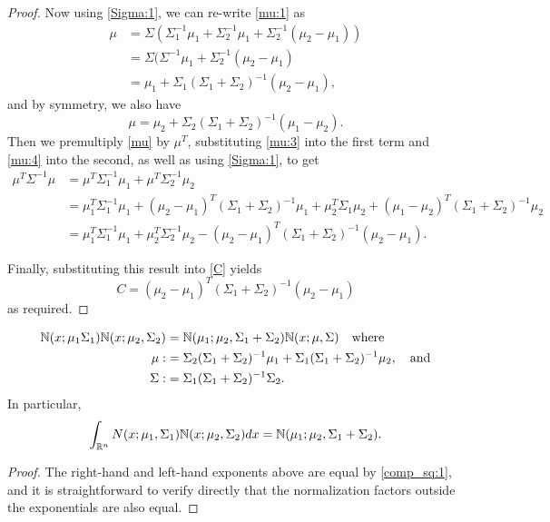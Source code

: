 \documentclass[12pt,leqno]{article}
\begin{document}
\begin{proof}
Now using \eqref{Sigma:1}, we can re-write \eqref{mu:1} as  
\begin{equation}\label{mu:3}
  \begin{split}
  \mu &= \Sigma(\Sigma_1^{-1}\mu_1 + \Sigma_2^{-1}\mu_1 +\Sigma_2^{-1}(\mu_2-\mu_1)) \\
  &= \Sigma(\Sigma^{-1}\mu_1 + \Sigma_2^{-1}(\mu_2-\mu_1) \\
  &= \mu_1 + \Sigma_1(\Sigma_1+\Sigma_2)^{-1}(\mu_2-\mu_1),
  \end{split}
  \end{equation}
and by symmetry, we also have 
\begin{equation}\label{mu:4}
  \mu = \mu_2 + \Sigma_2(\Sigma_1+\Sigma_2)^{-1}(\mu_1-\mu_2).
\end{equation}
Then we premultiply \eqref{mu} by $\mu^T$, substituting \eqref{mu:3} into the first term and
  \eqref{mu:4} into the second, as well as using \eqref{Sigma:1}, to get 
\begin{align*}
    \mu^T\Sigma^{-1}\mu &= \mu^T\Sigma_1^{-1}\mu_1 + \mu^T\Sigma_2^{-1}\mu_2 \\
    &= \mu_1^T\Sigma_1^{-1}\mu_1 + (\mu_2-\mu_1)^T(\Sigma_1+\Sigma_2)^{-1}\mu_1
    +\mu_2^T\Sigma_1\mu_2 + (\mu_1-\mu_2)^T(\Sigma_1+\Sigma_2)^{-1}\mu_2\\
    &= \mu_1^T\Sigma_1^{-1}\mu_1 + \mu_2^T\Sigma_2^{-1}\mu_2 - (\mu_2-\mu_1)^T(\Sigma_1+\Sigma_2)^{-1}(\mu_2-\mu_1).
\end{align*}

Finally, substituting this result into \eqref{C} yields
\begin{equation}\label{C:1}
  C = (\mu_2-\mu_1)^T(\Sigma_1+\Sigma_2)^{-1}(\mu_2-\mu_1)
\end{equation}
as required.
\end{proof}

\begin{Cor}
\begin{align}
  {\mathbb N}(x;\mu_1\Sigma_1){\mathbb N}(x;\mu_2,\Sigma_2) &= {\mathbb N}(\mu_1;\mu_2,\Sigma_1+\Sigma_2)
  {\mathbb N}(x;\mu,\Sigma) \quad\text{where}\label{comp_sq:2}\\
 \mu :&= \Sigma_2(\Sigma_1+\Sigma_2)^{-1}\mu_1+\Sigma_1(\Sigma_1+\Sigma_2)^{-1}\mu_2, \quad\text{and}\notag\\
 \Sigma :&= \Sigma_1(\Sigma_1 + \Sigma_2)^{-1}\Sigma_2.\notag
\end{align}
In particular,
\begin{equation}\label{int_prod}
  \int_{{\mathbb R}^n}N(x;\mu_1,\Sigma_1){\mathbb N}(x;\mu_2,\Sigma_2)dx = {\mathbb N}(\mu_1;\mu_2,\Sigma_1+\Sigma_2).
  \end{equation}
\begin{proof}
  The right-hand and left-hand exponents above are equal by \eqref{comp_sq:1}, and it is
  straightforward to verify directly that the normalization factors outside the exponentials are also equal. 
\end{proof}
\end{Cor}
\end{document}
